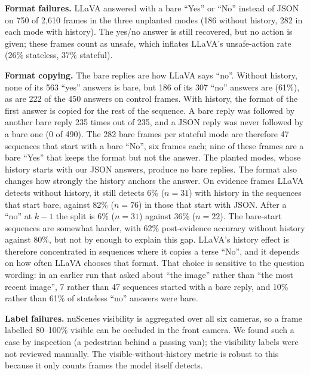 \documentclass[conference]{IEEEtran}
\begin{document}
\textbf{Format failures.} LLaVA answered with a bare ``Yes'' or ``No'' instead of JSON on 750 of 2{,}610 frames in the three unplanted modes (186 without history, 282 in each mode with history). The yes/no answer is still recovered, but no action is given; these frames count as unsafe, which inflates LLaVA's unsafe-action rate (26\% stateless, 37\% stateful).

\textbf{Format copying.} The bare replies are how LLaVA says ``no''. Without history, none of its 563 ``yes'' answers is bare, but 186 of its 307 ``no'' answers are (61\%), as are 222 of the 450 answers on control frames. With history, the format of the first answer is copied for the rest of the sequence. A bare reply was followed by another bare reply 235 times out of 235, and a JSON reply was never followed by a bare one (0 of 490). The 282 bare frames per stateful mode are therefore 47 sequences that start with a bare ``No'', six frames each; nine of these frames are a bare ``Yes'' that keeps the format but not the answer. The planted modes, whose history starts with our JSON answers, produce no bare replies. The format also changes how strongly the history anchors the answer. On evidence frames LLaVA detects without history, it still detects 6\% ($n=31$) with history in the sequences that start bare, against 82\% ($n=76$) in those that start with JSON. After a ``no'' at $k-1$ the split is 6\% ($n=31$) against 36\% ($n=22$). The bare-start sequences are somewhat harder, with 62\% post-evidence accuracy without history against 80\%, but not by enough to explain this gap. LLaVA's history effect is therefore concentrated in sequences where it copies a terse ``No'', and it depends on how often LLaVA chooses that format. That choice is sensitive to the question wording: in an earlier run that asked about ``the image'' rather than ``the most recent image'', 7 rather than 47 sequences started with a bare reply, and 10\% rather than 61\% of stateless ``no'' answers were bare.

\textbf{Label failures.} nuScenes visibility is aggregated over all six cameras, so a frame labelled 80--100\% visible can be occluded in the front camera. We found such a case by inspection (a pedestrian behind a passing van); the visibility labels were not reviewed manually. The visible-without-history metric is robust to this because it only counts frames the model itself detects.
\end{document}
